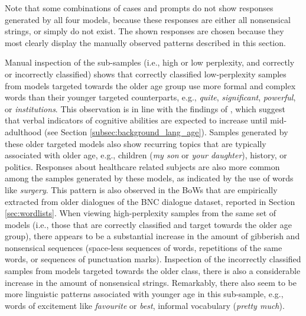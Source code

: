 \begin{table}[H]
{%
Note that some combinations of cases and prompts do not show responses generated by all four models, because these responses are either all nonsensical strings, or simply do not exist.
The shown responses are chosen because they most clearly display the manually observed patterns described in this section.}\label{tab:ctg_case_examples}
\end{table}

Manual inspection of the sub-samples (i.e., high or low perplexity, and correctly or incorrectly classified) shows that correctly classified low-perplexity samples from models targeted towards the older age group use more formal and complex words than their younger targeted counterparts, e.g., \textit{quite}, \textit{significant}, \textit{powerful}, or \textit{institutions}. 
This observation is in line with the findings of \cite{pennebaker2003words}, which suggest that verbal indicators of cognitive abilities are expected to increase until mid-adulthood (see Section \ref{subsec:background_lang_age}).
Samples generated by these older targeted models also show recurring topics that are typically associated with older age, e.g., children (\textit{my son} or \textit{your daughter}), history, or politics. 
Responses about healthcare related subjects are also more common among the samples generated by these models, as indicated by the use of words like \textit{surgery}. This pattern is also observed in the BoWs that are empirically extracted from older dialogues of the BNC dialogue dataset, reported in Section \ref{sec:wordlists}. When viewing high-perplexity samples from the same set of models (i.e., those that are correctly classified and target towards the older age group), there appears to be a substantial increase in the amount of gibberish and nonsensical sequences (space-less sequences of words, repetitions of the same words, or sequences of punctuation marks). Inspection of the incorrectly classified samples from models targeted towards the older class, there is also a considerable increase in the amount of nonsensical strings. Remarkably, there also seem to be more linguistic patterns associated with younger age in this sub-sample, e.g., words of excitement like \textit{favourite} or \textit{best}, informal vocabulary (\textit{pretty much}).

